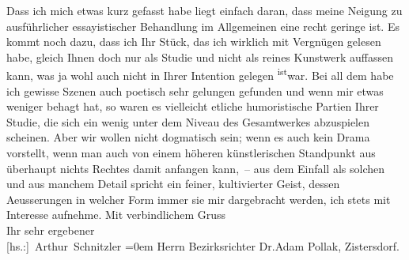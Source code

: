 \begin{ledgroupsized}[t]{13cm}
                    Dass ich mich etwas kurz gefasst habe liegt einfach daran, dass meine Neigung zu
                    ausführlicher essayistischer Behandlung im Allgemeinen eine recht geringe ist.
                    Es kommt noch dazu, dass ich Ihr Stück, das ich wirklich mit Vergnügen gelesen habe, gleich Ihnen doch
                    nur als Studie und nicht als reines Kunstwerk auffassen kann, was ja wohl auch
                    nicht in Ihrer Intention gelegen \substVorne{}\textsuperscript{ist}\substDazwischen{}war\substHinten{}. Bei all dem habe ich gewisse Szenen auch poetisch sehr gelungen
                    gefunden und wenn mir etwas weniger behagt hat, so waren es vielleicht etliche
                    humoristische Partien Ihrer Studie, die sich ein wenig unter dem Niveau des Gesamtwerkes abzuspielen
                    scheinen. Aber wir wollen nicht dogmatisch sein; wenn {\pb}es auch kein Drama  vorstellt, wenn man
                    auch von einem höheren künstlerischen Standpunkt aus überhaupt nichts Rechtes
                    damit anfangen kann, – aus dem Einfall als solchen und aus manchem Detail
                    spricht ein feiner, kultivierter Geist, dessen Aeusserungen in welcher Form
                    immer sie mir dargebracht werden, ich \introOben{}stets\introOben{} mit
                    Interesse aufnehme.\pend
           \pstart
           Mit verbindlichem Gruss{\\[\baselineskip]}Ihr sehr ergebener{\\[\baselineskip]}\spacefill\mbox{{[}hs.:{]} Arthur Schnitzler}\pend
           \leftskip=0em{}\pstart
           \noindent{}Herrn Bezirksrichter Dr.Adam Pollak, Zistersdorf.\pend
           
         
         \endnumbering{}\end{ledgroupsized}  \newcommand{\dateiname}{L02137}\newcommand{\titel}{Arthur Schnitzler an Robert Adam, 13. 5. 1913}\newcommand{\editorInnen}{Martin Anton Müller und Gerd-Hermann Susen}
      